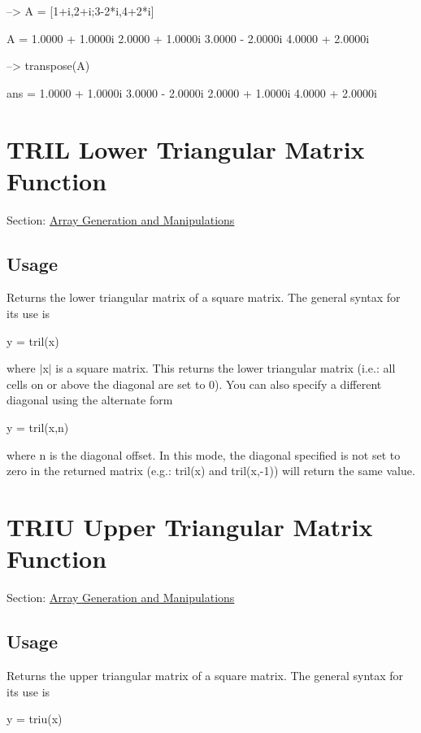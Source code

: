 \begin{DoxyVerbInclude}
--> A = [1+i,2+i;3-2*i,4+2*i]

A = 
   1.0000 +  1.0000i   2.0000 +  1.0000i 
   3.0000 -  2.0000i   4.0000 +  2.0000i 

--> transpose(A)

ans = 
   1.0000 +  1.0000i   3.0000 -  2.0000i 
   2.0000 +  1.0000i   4.0000 +  2.0000i 
\end{DoxyVerbInclude}
 \hypertarget{array_tril}{}\section{T\-R\-I\-L Lower Triangular Matrix Function}\label{array_tril}
Section\-: \hyperlink{sec_array}{Array Generation and Manipulations} \hypertarget{vtkwidgets_vtkxyplotwidget_Usage}{}\subsection{Usage}\label{vtkwidgets_vtkxyplotwidget_Usage}
Returns the lower triangular matrix of a square matrix. The general syntax for its use is \begin{DoxyVerb}   y = tril(x)
\end{DoxyVerb}
 where $|$x$|$ is a square matrix. This returns the lower triangular matrix (i.\-e.\-: all cells on or above the diagonal are set to 0). You can also specify a different diagonal using the alternate form \begin{DoxyVerb}   y = tril(x,n)
\end{DoxyVerb}
 where n is the diagonal offset. In this mode, the diagonal specified is not set to zero in the returned matrix (e.\-g.\-: tril(x) and tril(x,-\/1)) will return the same value. \hypertarget{array_triu}{}\section{T\-R\-I\-U Upper Triangular Matrix Function}\label{array_triu}
Section\-: \hyperlink{sec_array}{Array Generation and Manipulations} \hypertarget{vtkwidgets_vtkxyplotwidget_Usage}{}\subsection{Usage}\label{vtkwidgets_vtkxyplotwidget_Usage}
Returns the upper triangular matrix of a square matrix. The general syntax for its use is \begin{DoxyVerb}   y = triu(x)
\end{DoxyVerb}
